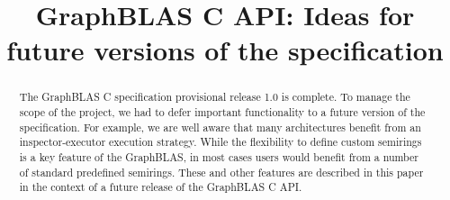 \documentclass[conference]{IEEEtran}
\begin{document}
\pagestyle{plain}

\title{GraphBLAS C API: Ideas for future versions of the specification}

%
%
\author{
%
}
\maketitle
\thispagestyle{plain}
\begin{abstract}
The GraphBLAS C specification provisional release 1.0 is complete.   To manage the 
scope of the project, we had to defer important functionality to a future version of the
specification.  For example, we are well aware that many architectures benefit from an
inspector-executor execution strategy.  While the flexibility to define custom semirings
is a key feature of the GraphBLAS, in most cases users would benefit from a 
number of standard predefined semirings.  These and other features are described
in this paper in the context of a future release of the GraphBLAS C API.  
\end{abstract}



\label{sec:stddefs}

\label{sec:inspecExec}

\label{sec:dag}

\label{sec:masks}

\label{sec:usrTypes}

\label{sec:kronProd}

\label{sec:promotion}

\newpage



\end{document}
